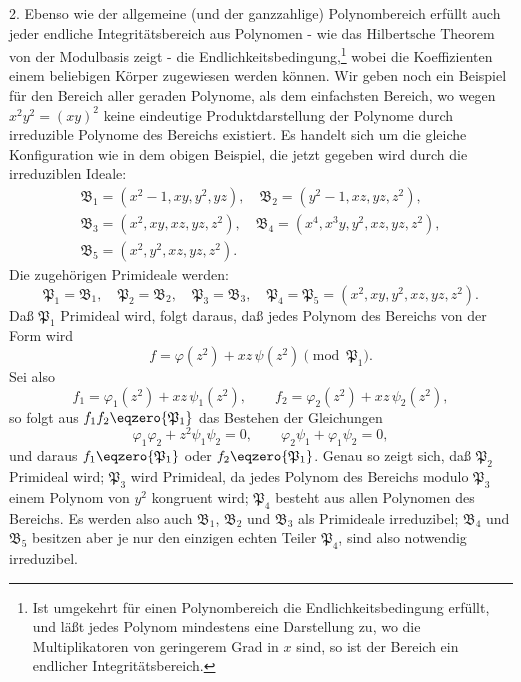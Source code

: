 \documentclass[11pt]{article}
\newcommand{\ideal}[1]{\mathfrak{#1}}
\begin{document}
2. Ebenso wie der allgemeine (und der ganzzahlige) Polynombereich erfüllt auch jeder endliche Integritätsbereich aus Polynomen - wie das Hilbertsche Theorem von der Modulbasis zeigt - die Endlichkeitsbedingung,\footnote{Ist umgekehrt für einen Polynombereich die Endlichkeitsbedingung erfüllt, und läßt jedes Polynom mindestens eine Darstellung zu, wo die Multiplikatoren von geringerem Grad in $x$ sind, so ist der Bereich ein endlicher Integritätsbereich.} wobei die Koeffizienten einem beliebigen Körper zugewiesen werden können. Wir geben noch ein Beispiel für den Bereich aller geraden Polynome, als dem einfachsten Bereich, wo wegen $x^2y^2=(xy)^2$ keine eindeutige Produktdarstellung der Polynome durch irreduzible Polynome des Bereichs existiert. Es handelt sich um die gleiche Konfiguration wie in dem obigen Beispiel, die jetzt gegeben wird durch die irreduziblen Ideale:
\[
\begin{gathered}
 \ideal B_1=(x^2-1,xy,y^2,yz),\quad
 \ideal B_2=(y^2-1,xz,yz,z^2),\\
 \ideal B_3=(x^2,xy,xz,yz,z^2),\quad
 \ideal B_4=(x^4,x^3y,y^2,xz,yz,z^2),\\
 \ideal B_5=(x^2,y^2,xz,yz,z^2).
\end{gathered}
\]
Die zugehörigen Primideale werden:
\[
 \ideal P_1=\ideal B_1,
 \quad \ideal P_2=\ideal B_2,
 \quad \ideal P_3=\ideal B_3,
 \quad \ideal P_4=\ideal P_5=(x^2,xy,y^2,xz,yz,z^2).
\]
Daß $\ideal P_1$ Primideal wird, folgt daraus, daß jedes Polynom des Bereichs von der Form wird
\[
 f=\varphi(z^2)+xz\,\psi(z^2)\pmod{\ideal P_1}.
\]
Sei also
\[
 f_1=\varphi_1(z^2)+xz\,\psi_1(z^2),
 \qquad
 f_2=\varphi_2(z^2)+xz\,\psi_2(z^2),
\]
so folgt aus $f_1f_2\eqzero{\ideal P_1}$ das Bestehen der Gleichungen
\[
 \varphi_1\varphi_2+z^2\psi_1\psi_2=0,
 \qquad
 \varphi_2\psi_1+\varphi_1\psi_2=0,
\]
und daraus $f_1\eqzero{\ideal P_1}$ oder $f_2\eqzero{\ideal P_1}$. Genau so zeigt sich, daß $\ideal P_2$ Primideal wird; $\ideal P_3$ wird Primideal, da jedes Polynom des Bereichs modulo $\ideal P_3$ einem Polynom von $y^2$ kongruent wird; $\ideal P_4$ besteht aus allen Polynomen des Bereichs. Es werden also auch $\ideal B_1$, $\ideal B_2$ und $\ideal B_3$ als Primideale irreduzibel; $\ideal B_4$ und $\ideal B_5$ besitzen aber je nur den einzigen echten Teiler $\ideal P_4$, sind also notwendig irreduzibel.
\end{document}
